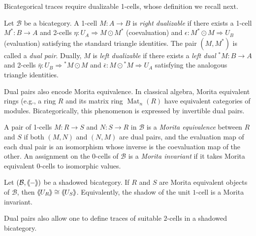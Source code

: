 \documentclass[11pt,oneside]{amsart}
\numberwithin{equation}{section}
\numberwithin{figure}{section}
\theoremstyle{plain}
\theoremstyle{definition}
\theoremstyle{remark}
\newcommand{\shspace}{\hspace{.5mm}} %
\newcommand{\sh}[1]{{\ensuremath{\shspace\hspace{1mm}\makebox[-1mm]{$\langle$}\makebox[0mm]{$\langle$}\hspace{1mm}{#1}\makebox[1mm]{$\rangle$}\makebox[0mm]{$\rangle$}\shspace}}}
\begin{document}
 
 
 

 

Bicategorical traces require dualizable 1-cells, whose definition we recall next.

\begin{definition}\label{def:dualizability}
Let \(\mathcal{B}\) be a bicategory. A 1-cell \(M \colon A \to B\) is \emph{right dualizable} if there exists a 1-cell \(M^* \colon B \to A\) and 2-cells \(\eta \colon U_A \Rightarrow M \odot M^*\) (coevaluation) and \(\epsilon \colon M^* \odot M \Rightarrow U_B\) (evaluation) satisfying the standard triangle identities. The pair \((M,M^*)\) is called a \emph{dual pair}. Dually, \(M\) is \emph{left dualizable} if there exists a \emph{left dual} \({}^*M \colon B \to A\) and 2-cells \(\bar{\eta} \colon U_B \Rightarrow {}^*M \odot M\) and \(\bar{\epsilon} \colon M \odot {}^*M \Rightarrow U_A\) satisfying the analogous triangle identities.
\end{definition}

Dual pairs also encode Morita equivalence. In classical algebra, Morita equivalent rings (e.g., a ring \(R\) and its matrix ring \(\operatorname{Mat}_n(R)\) have equivalent categories of modules. Bicategorically, this phenomenon is expressed by invertible dual pairs.

\begin{definition}\label{def:morita_equivalence}
A pair of 1-cells \(M\colon R\to S\) and \(N\colon S\to R\) in \(\mathcal{B}\) is a \emph{Morita equivalence} between \(R\) and \(S\) if both \((M,N)\) and \((N,M)\) are dual pairs, and the evaluation map of each dual pair is an isomorphism whose inverse is the coevaluation map of the other. An assignment on the \(0\)-cells of \(\mathcal{B}\) is a \emph{Morita invariant} if it takes Morita equivalent \(0\)-cells to isomorphic values.
\end{definition}

\begin{prop}
Let \((\mathcal{B},\sh{-})\) be a shadowed bicategory. If \(R\) and \(S\) are Morita equivalent objects of \(\mathcal{B}\), then \(\sh{U_R}\cong \sh{U_S}\). Equivalently, the shadow of the unit \(1\)-cell is a Morita invariant.
\end{prop}

Dual pairs also allow one to define traces of suitable \(2\)-cells in a shadowed bicategory.
\end{document}
